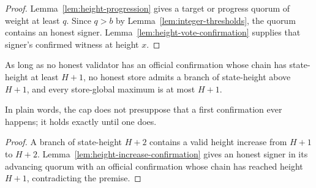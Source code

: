 \begin{proof}
Lemma~\ref{lem:height-progression} gives a target or progress quorum of weight
at least \(q\).  Since \(q>b\) by
Lemma~\ref{lem:integer-thresholds}, the quorum contains an honest signer.
Lemma~\ref{lem:height-vote-confirmation} supplies that signer's confirmed
witness at height \(x\).
\end{proof}

\begin{lemma}
\label{lem:pre-confirmation-cap}
As long as no honest validator has an official confirmation whose chain has
state-height at least \(H+1\), no honest store admits a branch of
state-height above \(H+1\), and every store-global maximum is at most
\(H+1\).

In plain words, the cap does not presuppose that a first confirmation ever
happens; it holds exactly until one does.
\end{lemma}

\begin{proof}
A branch of state-height \(H+2\) contains a valid height increase from
\(H+1\) to \(H+2\).  Lemma~\ref{lem:height-increase-confirmation} gives
an honest signer in its advancing quorum with an official confirmation
whose chain has reached height \(H+1\), contradicting the premise.
\end{proof}

